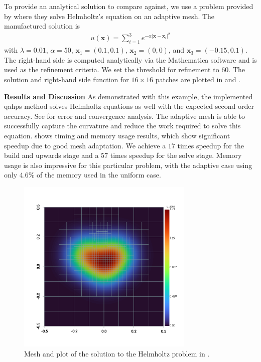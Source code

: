 To provide an analytical solution to compare against, we use a problem provided by \cite{cheng2006adaptive} where they solve Helmholtz's equation on an adaptive mesh. The manufactured solution is
\begin{align}
    u(\textbf{x}) = \sum_{i=1}^{3} e^{-\alpha |\textbf{x} - \textbf{x}_i|^2}
\end{align}
with $\lambda=0.01$, $\alpha=50$, $\textbf{x}_1 = (0.1, 0.1)$, $\textbf{x}_2 = (0, 0)$, and $\textbf{x}_3 = (-0.15, 0.1)$. The right-hand side is computed analytically via the Mathematica software \citep{wolfram2023mathematica} and is used as the refinement criteria. We set the threshold for refinement to $60$. The solution and right-hand side function for $16 \times 16$ patches are plotted in  and .

{\bf Results and Discussion}
As demonstrated with this example, the implemented \gls{qahps} method solves Helmholtz equations as well with the expected second order accuracy. See  for error and convergence analysis. The adaptive mesh is able to successfully capture the curvature and reduce the work required to solve this equation.  shows timing and memory usage results, which show significant speedup due to good mesh adaptation. We achieve a $17$ times speedup for the build and upwards stage and a $57$ times speedup for the solve stage. Memory usage is also impressive for this particular problem, with the adaptive case using only $4.6\%$ of the memory used in the uniform case.

\begin{figure}
    \centering
    \includegraphics[width=0.75\textwidth, trim={0 100 0 0}]{figures/plot_helmholtz_u.png}
    \caption{Mesh and plot of the solution to the Helmholtz problem in .}
    \label{fig:helmholtz_u_plot}
\end{figure}

